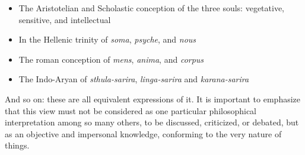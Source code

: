 \begin{itemize}


\item The Aristotelian and Scholastic conception of the three souls: vegetative, sensitive, and intellectual

\item In the Hellenic trinity of \emph{soma}, \emph{psyche}, and \emph{nous}

\item The roman conception of \emph{mens}, \emph{anima}, and \emph{corpus}

\item The Indo-Aryan of \emph{sthula-sarira}, \emph{linga-sarira} and \emph{karana-sarira}

\end{itemize}


And so on: these are all equivalent expressions of it. It is important to emphasize that this view must not be considered as one particular philosophical interpretation among so many others, to be discussed, criticized, or debated, but as an objective and impersonal knowledge, conforming to the very nature of things.



